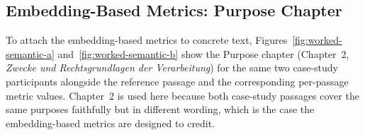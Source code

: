 \subsection{Embedding-Based Metrics: Purpose Chapter}
\label{app:worked-semantic}

To attach the embedding-based metrics to concrete text,
Figures~\ref{fig:worked-semantic-a} and~\ref{fig:worked-semantic-b}
show the Purpose chapter (Chapter~2, \emph{Zwecke und
Rechtsgrundlagen der Verarbeitung}) for the same two case-study
participants alongside the reference passage and the
corresponding per-passage metric values. Chapter~2 is used here
because both case-study passages cover the same purposes
faithfully but in different wording, which is the case the
embedding-based metrics are designed to credit.

\begingroup
{}
